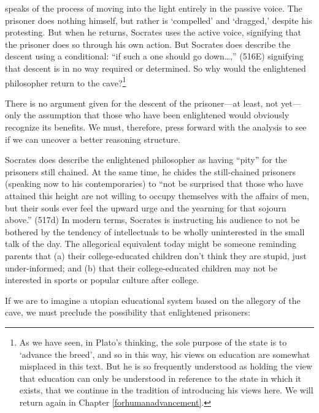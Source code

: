  speaks of the process of moving into the light entirely in the passive voice. The prisoner does nothing himself, but rather is `compelled' and `dragged,' despite his protesting. But when he returns, Socrates uses the active voice, signifying that the prisoner does so through his own action. But Socrates does describe the descent using a conditional: ``if such a one should go down{\ldots},'' (516E) signifying that descent is in no way required or determined. So why would the enlightened philosopher return to the cave?\footnote{As we have seen, in Plato's thinking, the sole purpose of the state is to `advance the breed', and so in this way, his views on education are somewhat misplaced in this text. But he is so frequently understood as holding the view that education can only be understood in reference to the state in which it exists, that we continue in the tradition of introducing his views here. We will return again in Chapter \ref{forhumanadvancement}.}

There is no argument given for the descent of the prisoner---at least, not yet---only the assumption that those who have been enlightened would obviously recognize its benefits. We must, therefore, press forward with the analysis to see if we can uncover a better reasoning structure.

Socrates does describe the enlightened philosopher as having ``pity'' for the prisoners still chained. At the same time, he chides the still-chained prisoners (speaking now to his contemporaries) to ``not be surprised that those who have attained this height are not willing to occupy themselves with the affairs of men, but their souls ever feel the upward urge and the yearning for that sojourn above.'' (517d) In modern terms, Socrates is instructing his audience to not be bothered by the tendency of intellectuals to be wholly uninterested in the small talk of the day. The allegorical equivalent today might be someone reminding parents that (a) their college-educated children don't think they are stupid, just under-informed; and (b) that their college-educated children may not be interested in sports or popular culture after college.

If we are to imagine a utopian educational system based on the allegory of the cave, we must preclude the possibility that enlightened prisoners:

